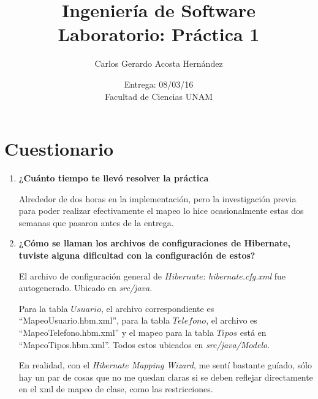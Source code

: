 \documentclass[12pt]{article}
\title{Ingeniería de Software \\ Laboratorio: Práctica 1}
\author{Carlos Gerardo Acosta Hernández}
\date{Entrega: 08/03/16 \\ Facultad de Ciencias UNAM}
\begin{document}
\maketitle
\section{Cuestionario}
\begin{enumerate}
\item \textbf{¿Cuánto tiempo te llevó resolver la práctica} \par
  Alrededor de dos horas en la implementación, pero la investigación previa para poder realizar efectivamente el mapeo lo hice ocasionalmente estas dos semanas que pasaron antes de la entrega.
\item \textbf{¿Cómo se llaman los archivos de configuraciones de Hibernate, tuviste alguna dificultad con la configuración de estos? } \par
  El archivo de configuración general de $Hibernate$: \textit{hibernate.cfg.xml} fue autogenerado. Ubicado en \textit{src/java}.\par
  Para la tabla $Usuario$, el archivo correspondiente es ``MapeoUsuario.hbm.xml'', para la tabla $Telefono$, el archivo es ``MapeoTelefono.hbm.xml'' y el mapeo para la tabla $Tipos$ está en ``MapeoTipos.hbm.xml''. Todos estos ubicados en \textit{src/java/Modelo}. \par
  En realidad, con el \textit{Hibernate Mapping Wizard}, me sentí bastante guíado, sólo hay un par de cosas que no me quedan claras si se deben reflejar directamente en el xml de mapeo de clase, como las restricciones.  \\
\end{enumerate}
\end{document}
